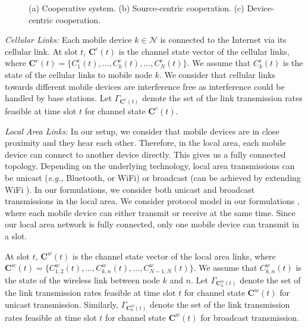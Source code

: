 \documentclass[conference]{IEEEtran}
\newcommand{\eg}{{\em e.g., }}
\newcommand{\Nset}{\mathcal{N}}
\begin{document}
\begin{figure}[t!]
\centering
{}  
\vspace{-5pt}
\caption{(a) Cooperative system. (b) Source-centric cooperation. (c) Device-centric cooperation.}
\vspace{-10pt}
\label{fig:forward_backward-system}
\end{figure}

{\em Cellular Links:} Each mobile device $k \in \Nset$ is connected to the Internet via its cellular link. At slot $t$, $\boldsymbol C^{c}(t)$ is the channel state vector of the cellular links, where $\boldsymbol C^{c}(t) = \{C_{1}^{c}(t), ..., C_{k}^{c}(t), ..., C_{N}^{c}(t)\}$. We assume that $C_{k}^{c}(t)$ is the state of the cellular links to mobile node $k$. We consider that cellular links towards different mobile devices are interference free as interference could be handled by base stations. Let $\Gamma_{\boldsymbol C^{c}(t)}$ denote the set of the link transmission rates feasible at time slot $t$ for channel state $\boldsymbol C^{c}(t)$.


{\em Local Area Links:}
In our setup, we consider that mobile devices are in close proximity and they hear each other. Therefore, in the local area, each mobile device can connect to another device directly. This gives us a fully connected topology. Depending on the underlying technology, local area transmissions can be unicast (\eg Bluetooth, or WiFi) or broadcast (can be achieved by extending WiFi \cite{microcast}). In our formulations, we consider both unicast and broadcast transmissions in the local area. We consider protocol model in our formulations \cite{gupta_interference_model}, where each mobile device can either transmit or receive at the same time. Since our local area network is fully connected, only one mobile device can transmit in a slot.

At slot $t$, $\boldsymbol C^{w}(t)$ is the channel state vector of the local area links, where $\boldsymbol C^{w}(t) = \{C_{1,2}^{w}(t), ..., C_{k,n}^{w}(t), ..., C_{N-1,N}^{w}(t)\}$. We assume that $C_{k,n}^{w}(t)$ is the state of the wireless link between node $k$ and $n$. Let $\Gamma_{\boldsymbol C_{u}^{w}(t)}$ denote the set of the link transmission rates feasible at time slot $t$ for channel state $\boldsymbol C^{w}(t)$ for unicast transmission. Similarly, $\Gamma_{\boldsymbol C_{b}^{w}(t)}$ denote the set of the link transmission rates feasible at time slot $t$ for channel state $\boldsymbol C^{w}(t)$ for broadcast transmission.
\end{document}
